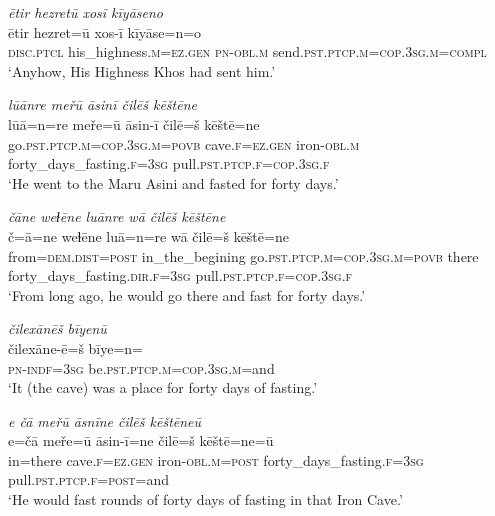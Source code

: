 \ea \label{ŽP.117}
\textit{ētir hezretū xosī kīyāseno} \\ 
\gll ētir hezret=ū xos-ī kīyāse=n=o \\ 
 \textsc{disc.ptcl} his\_highness\textsc{.m}\textsc{\textsc{=ez.gen}} \textsc{pn}\textsc{-obl}\textsc{.m} send\textsc{.pst}\textsc{.ptcp}\textsc{.m}\textsc{=cop}\textsc{.3sg}\textsc{.m}\textsc{=compl} \\ 
\glt `Anyhow, His Highness Khos had sent him.'
\z 
 
\ea \label{ŽP.118}
\textit{lūānre meřū āsinī čilēš kēštēne} \\ 
\gll lūā=n=re meře=ū āsin-ī čilē=š kēštē=ne \\ 
 go\textsc{.pst}\textsc{.ptcp}\textsc{.m}\textsc{=cop}\textsc{.3sg}\textsc{.m}\textsc{=\textsc{povb}} cave\textsc{.f}\textsc{\textsc{=ez.gen}} iron\textsc{-obl}\textsc{.m} forty\_days\_fasting\textsc{.f}\textsc{=3sg} pull\textsc{.pst}\textsc{.ptcp}\textsc{.f}\textsc{=cop}\textsc{.3sg}\textsc{.f} \\ 
\glt `He went to the Maru Asini and fasted for forty days.'
\z 
 
\ea \label{ŽP.119}
\textit{čāne weɫēne luānre wā čilēš kēštēne} \\ 
\gll č=ā=ne weɫēne luā=n=re wā čilē=š kēštē=ne \\ 
 from=\textsc{dem.dist}\textsc{=\textsc{post}} in\_the\_begining go\textsc{.pst}\textsc{.ptcp}\textsc{.m}\textsc{=cop}\textsc{.3sg}\textsc{.m}\textsc{=\textsc{povb}} there forty\_days\_fasting\textsc{.dir}\textsc{.f}\textsc{=3sg} pull\textsc{.pst}\textsc{.ptcp}\textsc{.f}\textsc{=cop}\textsc{.3sg}\textsc{.f} \\ 
\glt `From long ago, he would go there and fast for forty days.'
\z 
 
\ea \label{ŽP.120}
\textit{čilexānēš bīyenū} \\ 
\gll čilexāne-ē=š bīye=n=\\ 
 \textsc{pn}\textsc{-indf}\textsc{=3sg} be\textsc{.pst}\textsc{.ptcp}\textsc{.m}\textsc{=cop}\textsc{.3sg}\textsc{.m}=and \\ 
\glt `It (the cave) was a place for forty days of fasting.'
\z 
 
\ea \label{ŽP.121}
\textit{e čā meřū āsnīne čilēš kēštēneū} \\ 
\gll e=čā meře=ū āsin-ī=ne čilē=š kēštē=ne=ū \\ 
 in=there cave\textsc{.f}\textsc{\textsc{=ez.gen}} iron\textsc{-obl}\textsc{.m}\textsc{=\textsc{post}} forty\_days\_fasting\textsc{.f}\textsc{=3sg} pull\textsc{.pst}\textsc{.ptcp}\textsc{.f}\textsc{=\textsc{post}}=and \\ 
\glt `He would fast rounds of forty days of fasting in that Iron Cave.'
\z 
 
